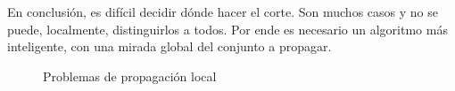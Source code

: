 En conclusión, es difícil decidir dónde hacer el corte. Son muchos casos y no se puede, localmente, distinguirlos a todos. Por ende es necesario un algoritmo más inteligente, con una mirada global del conjunto a propagar.
\begin{figure}[htb]
	\centering
	\caption{Problemas de propagación local}
	\label{fig:propagacionLocal}
\end{figure}

